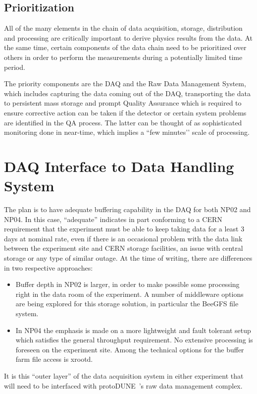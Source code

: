 \documentclass[pdftex,12pt,letter]{article}
\newcommand{\pd}{protoDUNE\ }
\begin{document}
\subsection{Prioritization}

All of the many elements in the chain of data acquisition, storage, distribution and processing are critically important to derive physics results  from the data. At the same time, certain components of the data chain need to be prioritized over others in order to perform the measurements during a potentially limited time period.

The priority components are the DAQ and the Raw Data Management System, which includes capturing the data coming out of the DAQ, transporting the data to persistent mass storage and prompt Quality Assurance which is required to ensure corrective action can be taken if the detector or certain system problems are identified in the QA process. The latter can be thought of as sophisticated monitoring done in near-time, which implies a ``few minutes’’ scale of processing.


\section{DAQ Interface to Data Handling System}

The plan is to have adequate buffering capability in the DAQ for both NP02 and NP04. In this case, “adequate” indicates in part conforming to a CERN requirement that the experiment must be able to keep taking data for a least 3 days at nominal rate, even if there is an occasional problem with the data link between the experiment site and CERN storage facilities, an issue with central storage or any type of similar outage. At the time of writing, there are differences in two respective approaches:
\begin{itemize}
\item Buffer depth in NP02 is larger, in order to make possible some processing right in the data room of the experiment. A number of middleware options are being explored for this storage solution, in particular the BeeGFS file system.

\item In NP04 the emphasis is made on a more lightweight and fault tolerant setup which satisfies the general throughput requirement. No extensive processing is foreseen on the experiment site. Among the technical options for the buffer farm file access is xrootd.
\end{itemize}
It is this “outer layer” of the data acquisition system in either experiment that will need to be interfaced with \pd’s raw data management complex.
\end{document}
